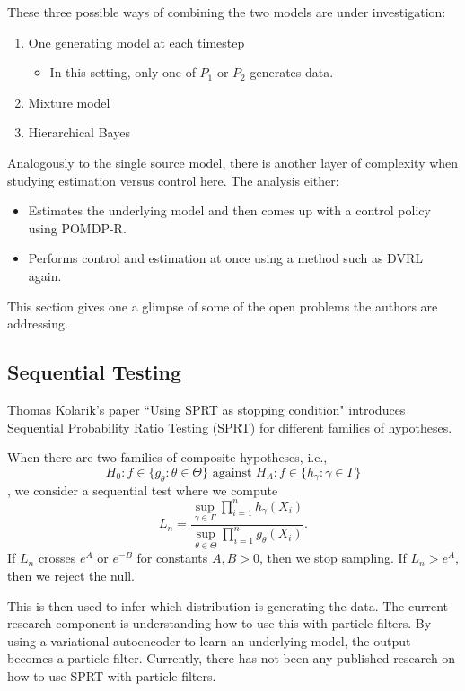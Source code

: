 \documentclass[english]{article}
\numberwithin{equation}{section}
\begin{document}
	These three possible ways of combining the two models are under investigation:
	\begin{enumerate}
		\item One generating model at each timestep
			\begin{itemize}
				\item In this setting, only one of $P_1$ or $P_2$ generates data.
			\end{itemize}
		\item Mixture model
		\item Hierarchical Bayes
	\end{enumerate}
	
	Analogously to the single source model, there is another layer of complexity when studying estimation versus control here. The analysis either:
	\begin{itemize}
		\item Estimates the underlying model and then comes up with a control policy using POMDP-R.
		\item Performs control and estimation at once using a method such as DVRL again.
	\end{itemize}
	
	This section gives one a glimpse of some of the open problems the authors are addressing.
	
	\subsection*{Sequential Testing}
	Thomas Kolarik's paper ``Using SPRT as stopping condition" 
	\cite{url} introduces Sequential Probability Ratio Testing (SPRT) for different families of hypotheses.
	
	When there are two families of composite hypotheses, i.e.,
	$$H_0: f\in \{g_{\theta}:\theta\in \Theta\} \textrm{ against } H_A:f\in \{h_{\gamma}:\gamma\in \Gamma\}$$, we consider a sequential test where we compute $$L_n = \frac{\sup_{\gamma\in \Gamma} \prod_{i=1}^n h_{\gamma}(X_i)}{\sup_{\theta\in \Theta} \prod_{i=1}^n g_{\theta}(X_i)}.$$ If $L_n$ crosses $e^A$ or $e^{-B}$ for constants $A,B>0$, then we stop sampling. If $L_n>e^A$, then we reject the null.
	
	This is then used to infer which distribution is generating the data.  The current research component is understanding how to use this with particle filters. By using a variational autoencoder to learn an underlying model, the output becomes a particle filter. Currently, there has not been any published research on how to use SPRT with particle filters.
	
\end{document}
